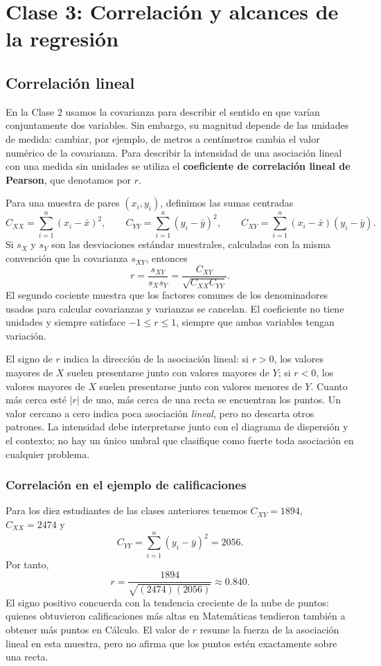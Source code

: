 \chapter{Clase 3: Correlación y alcances de la regresión}

\section{Correlación lineal}

En la Clase 2 usamos la covarianza para describir el sentido en que varían conjuntamente dos variables. Sin embargo, su magnitud depende de las unidades de medida: cambiar, por ejemplo, de metros a centímetros cambia el valor numérico de la covarianza. Para describir la intensidad de una asociación lineal con una medida sin unidades se utiliza el \textbf{coeficiente de correlación lineal de Pearson}, que denotamos por $r$.

Para una muestra de pares $(x_i,y_i)$, definimos las sumas centradas
\[
C_{XX}=\sum_{i=1}^{n}(x_i-\bar x)^2,\qquad
C_{YY}=\sum_{i=1}^{n}(y_i-\bar y)^2,\qquad
C_{XY}=\sum_{i=1}^{n}(x_i-\bar x)(y_i-\bar y).
\]
Si $s_X$ y $s_Y$ son las desviaciones estándar muestrales, calculadas con la misma convención que la covarianza $s_{XY}$, entonces
\[
r=\frac{s_{XY}}{s_Xs_Y}
=\frac{C_{XY}}{\sqrt{C_{XX}C_{YY}}}.
\]
El segundo cociente muestra que los factores comunes de los denominadores usados para calcular covarianzas y varianzas se cancelan. El coeficiente no tiene unidades y siempre satisface $-1\leq r\leq 1$, siempre que ambas variables tengan variación.

El signo de $r$ indica la dirección de la asociación lineal: si $r>0$, los valores mayores de $X$ suelen presentarse junto con valores mayores de $Y$; si $r<0$, los valores mayores de $X$ suelen presentarse junto con valores menores de $Y$. Cuanto más cerca esté $|r|$ de uno, más cerca de una recta se encuentran los puntos. Un valor cercano a cero indica poca asociación \emph{lineal}, pero no descarta otros patrones. La intensidad debe interpretarse junto con el diagrama de dispersión y el contexto; no hay un único umbral que clasifique como fuerte toda asociación en cualquier problema.

\subsection{Correlación en el ejemplo de calificaciones}

Para los diez estudiantes de las clases anteriores tenemos $C_{XY}=1894$, $C_{XX}=2474$ y
\[
C_{YY}=\sum_{i=1}^{n}(y_i-\bar y)^2=2056.
\]
Por tanto,
\[
r=\frac{1894}{\sqrt{(2474)(2056)}}\approx 0.840.
\]
El signo positivo concuerda con la tendencia creciente de la nube de puntos: quienes obtuvieron calificaciones más altas en Matemáticas tendieron también a obtener más puntos en Cálculo. El valor de $r$ resume la fuerza de la asociación lineal en esta muestra, pero no afirma que los puntos estén exactamente sobre una recta.

